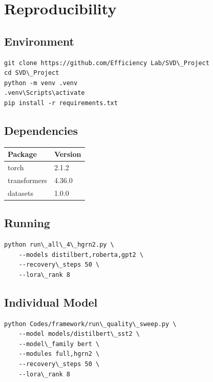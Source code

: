 \section{Reproducibility}

\subsection{Environment}

\begin{lstlisting}
git clone https://github.com/Efficiency Lab/SVD\_Project
cd SVD\_Project
python -m venv .venv
.venv\Scripts\activate
pip install -r requirements.txt
\end{lstlisting}

\subsection{Dependencies}

\begin{table}[H]
\centering
\small
\begin{tabular}{ll}
\toprule
\textbf{Package} & \textbf{Version} \\
\midrule
torch & 2.1.2 \\
transformers & 4.36.0 \\
datasets & 1.0.0 \\
\bottomrule
\end{tabular}
\end{table}

\subsection{Running}

\begin{lstlisting}
python run\_all\_4\_hgrn2.py \
    --models distilbert,roberta,gpt2 \
    --recovery\_steps 50 \
    --lora\_rank 8
\end{lstlisting}

\subsection{Individual Model}

\begin{lstlisting}
python Codes/framework/run\_quality\_sweep.py \
    --model models/distilbert\_sst2 \
    --model\_family bert \
    --modules full,hgrn2 \
    --recovery\_steps 50 \
    --lora\_rank 8
\end{lstlisting}

